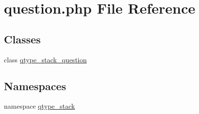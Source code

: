 \hypertarget{question_8php}{
\section{question.php File Reference}
\label{question_8php}
}
\subsection*{Classes}
\begin{DoxyCompactItemize}
\item 
class \hyperlink{classqtype__stack__question}{qtype\_\-stack\_\-question}
\end{DoxyCompactItemize}
\subsection*{Namespaces}
\begin{DoxyCompactItemize}
\item 
namespace \hyperlink{namespaceqtype__stack}{qtype\_\-stack}
\end{DoxyCompactItemize}
